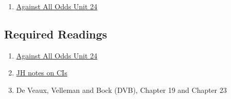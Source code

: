 \documentclass[letterpaper,12pt,twoside,]{pinp}
\providecommand{\tightlist}{%
  \setlength{\itemsep}{0pt}\setlength{\parskip}{0pt}}
\begin{document}
\begin{enumerate}
\def\labelenumi{\arabic{enumi}.}
\tightlist
\item
  \href{https://www.learner.org/series/against-all-odds-inside-statistics/confidence-intervals/}{Against
  All Odds Unit 24}
\end{enumerate}

\hypertarget{required-readings-3}{%
\subsection{Required Readings}\label{required-readings-3}}

\begin{enumerate}
\item \href{https://www.learner.org/wp-content/uploads/2019/03/AgainstAllOdds_StudentGuide_Unit24-Confidence-Intervals.pdf}{Against All Odds Unit 24}
\item \href{https://www.dropbox.com/s/epgqkz3g0qklcp9/Ch14ConfidenceIntervalsJH2018.pdf?dl=0}{JH notes on CIs}
\item De Veaux, Velleman and Bock (DVB), Chapter 19 and Chapter 23
\end{enumerate}





\end{document}
